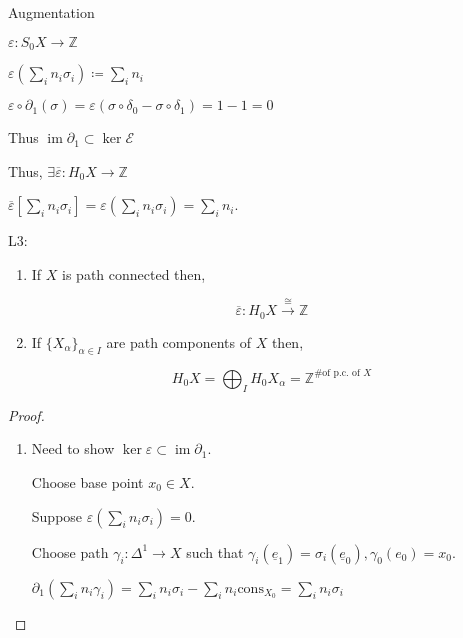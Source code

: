 \documentclass{article}
\theoremstyle{definition}
\begin{document}
    Augmentation

    \(\varepsilon : S_0 X \to \mathbb{Z}\)

    \(\varepsilon (\sum_{i} n_i \sigma_i) \coloneqq \sum_{i} n_{i}\)
    
    \(\varepsilon  \circ \partial_1 (\sigma) = \varepsilon  (\sigma \circ \delta_0 - \sigma \circ \delta_1) = 1-1 = 0\)

    Thus \(\operatorname{im} \partial_1 \subset \ker \mathscr{E}\)

    Thus, \(\exists \overline{\varepsilon}: H_0 X \to \mathbb{Z}\)

    \(\overline{\varepsilon} \left[\sum_{i} n_i \sigma_i\right] = \varepsilon \left( \sum_{i} n_i \sigma_i \right) = \sum_{i} n_i \). 

    L3:

    \begin{enumerate}[label=\arabic*)]
        \item If \(X\) is path connected then,
        
        \[
            \overline{\varepsilon}: H_0 X \xrightarrow{\cong}\mathbb{Z}
        \]

        \item If \(\{ X_\alpha \}_{\alpha \in I}\) are path components of \(X\) then,
        
        \[
            H_0 X = \bigoplus_{I} H_0 X_\alpha = \mathbb{Z}^{\text{\# of p.c. of } X} 
        \]
    \end{enumerate}
    
    \begin{proof}
        \begin{enumerate}[label=\arabic*)]
            \item Need to show \(\ker \varepsilon \subset \operatorname{im} \partial_1\).
            
            Choose base point \(x_0 \in X\).

            Suppose \(\varepsilon \left( \sum_{i} n_i \sigma_i \right) = 0\).

            Choose path \(\gamma_i: \Delta^1 \to X\) such that \(\gamma_i(\underline{e}_1) = \sigma_i(\underline{e}_0), \gamma_0(e_0) = x_0\).
            
            \(\partial_1 \left( \sum_{i} n_i \gamma_i \right) = \sum_{i} n_i \sigma_i - \sum_{i} n_i \text{cons}_{X_0} = \sum_{i} n_i \sigma_i \) 
        \end{enumerate} 
    \end{proof}
\end{document}
